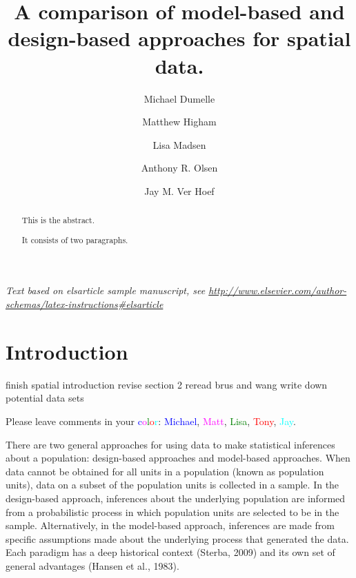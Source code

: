 \documentclass[]{elsarticle} %
\begin{document}
\begin{frontmatter}

  \title{A comparison of model-based and design-based approaches for
spatial data.}
    \author[USEPA]{Michael Dumelle}
    \author[STLAW]{Matthew Higham}
    \author[OSU]{Lisa Madsen}
  
    \author[USEPA]{Anthony R. Olsen}
  
    \author[NOAA]{Jay M. Ver Hoef}
  
      \address[USEPA]{United States Environmental Protection Agency, 200
SW 35th St, Corvallis, Oregon, 97333}
    \address[STLAW]{Saint Lawrence University Department of Math,
Computer Science, and Statistics, 23 Romoda Drive, Canton, New York,
13617}
    \address[OSU]{Oregon State University Department of Statistics, 239
Weniger Hall, Corvallis, Oregon, 97331}
    \address[NOAA]{Marine Mammal Laboratory, Alaska Fisheries Science
Center, National Oceanic and Atmospheric Administration, Seattle,
Washington, 98115}
  
  \begin{abstract}
  This is the abstract.

  It consists of two paragraphs.
  \end{abstract}
  
 \end{frontmatter}

\emph{Text based on elsarticle sample manuscript, see
\url{http://www.elsevier.com/author-schemas/latex-instructions\#elsarticle}}

\hypertarget{sec:introduction}{%
\section{Introduction}\label{sec:introduction}}

finish spatial introduction revise section 2 reread brus and wang write
down potential data sets

Please leave comments in your
\textcolor{blue}{c}\textcolor{magenta}{o}\textcolor{green}{l}\textcolor{red}{o}\textcolor{cyan}{r}:
\textcolor{blue}{Michael}, \textcolor{magenta}{Matt},
\textcolor{green}{Lisa}, \textcolor{red}{Tony}, \textcolor{cyan}{Jay}.

There are two general approaches for using data to make statistical
inferences about a population: design-based approaches and model-based
approaches. When data cannot be obtained for all units in a population
(known as population units), data on a subset of the population units is
collected in a sample. In the design-based approach, inferences about
the underlying population are informed from a probabilistic process in
which population units are selected to be in the sample. Alternatively,
in the model-based approach, inferences are made from specific
assumptions made about the underlying process that generated the data.
Each paradigm has a deep historical context (Sterba, 2009) and its own
set of general advantages (Hansen et al., 1983).
\end{document}
